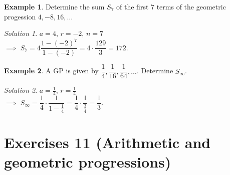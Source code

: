\documentclass[
  english,
  12pt,
  oneside]{book}
\theoremstyle{definition}
\theoremstyle{definition}
\newtheorem{example}{Example}[chapter]
\theoremstyle{definition}
\theoremstyle{definition}
\theoremstyle{remark}
\newtheorem*{solution}{Solution}
\begin{document}
\begin{example}
Determine the sum \(S_7\) of the first \(7\) terms of the geometric progession \(4,-8,16,\dots\)
\end{example}

\begin{solution}
\(a=4\), \(r=-2\), \(n=7\)\\
\(\implies\) \(S_7=4\dfrac{1-(-2)^7}{1-(-2)}=4\cdot\dfrac{129}3 = 172\).
\end{solution}

\begin{example}
A GP is given by \(\dfrac14,\dfrac1{16},\dfrac1{64},\dots\). Determine \(S_\infty\).
\end{example}

\begin{solution}
\(a=\frac14\), \(r=\frac14\)\\
\(\implies\) \(S_\infty = \dfrac{1}{4}\cdot\dfrac{1}{1-\frac14}= \dfrac{1}{4}\cdot\dfrac{1}{\frac{3}{4}}=\dfrac{1}{3}\).
\end{solution}

\chapter*{Exercises 11 (Arithmetic and geometric progressions)}\label{exercises-11-arithmetic-and-geometric-progressions}
\end{document}
